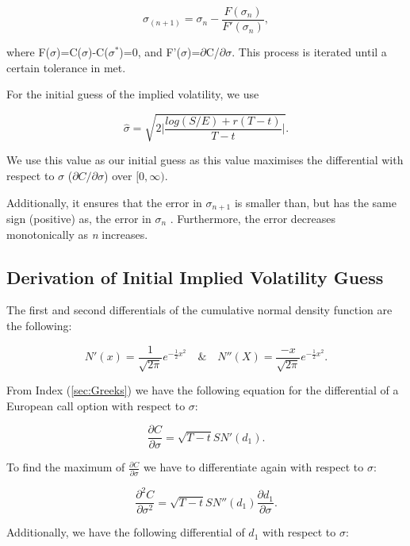 \documentclass[a4paper]{article}
\begin{document}
\begin{equation*}
	\sigma_{(n+1)}=\sigma_n-\frac{F(\sigma_n)}{F'(\sigma_n)},
\end{equation*}

where F($\sigma$)=C($\sigma$)-C($\sigma^*$)=0, and F'($\sigma$)=$\partial$C/$\partial \sigma$. This process is iterated until a certain tolerance in met.

For the initial guess of the implied volatility, we use

\begin{equation*}
	\hat{\sigma}=\sqrt{2\bigg|\frac{log(S/E)+r(T-t)}{T-t}\bigg|}.
\end{equation*} 

We use this value as our initial guess as this value maximises the differential with respect to $\sigma$ ($\partial C/$$\partial \sigma$) over $[0,\infty)$.

 Additionally, it ensures that the error in $\sigma_{n+1}$ is smaller than, but has the same sign (positive) as, the error in $\sigma_n$ \cite{Higham_2004}. Furthermore, the error decreases monotonically as \textit{n} increases.


\subsection{Derivation of Initial Implied Volatility Guess}

The first and second differentials of the cumulative normal density function are the following:

\[ N'(x) = \frac{1}{\sqrt{2\pi}}e^{-\frac{1}{2}x^2} \quad \& \quad N''(X) = \frac{-x}{\sqrt{2\pi}}e^{-\frac{1}{2}x^2}. \]

From Index (\ref{sec:Greeks}) we have the following equation for the differential of a European call option with respect to $\sigma$:

\[ \frac{\partial C}{\partial \sigma} = \sqrt{T-t}SN'(d_1). \]	

To find the maximum of $\frac{\partial C}{\partial \sigma}$ we have to differentiate again with respect to $\sigma$:

\[ \frac{\partial^2 C}{\partial \sigma^2} = \sqrt{T-t}SN''(d_1)\frac{\partial d_1}{\partial \sigma}. \]	

Additionally, we have the following differential of $d_1$ with respect to $\sigma$:
\end{document}
